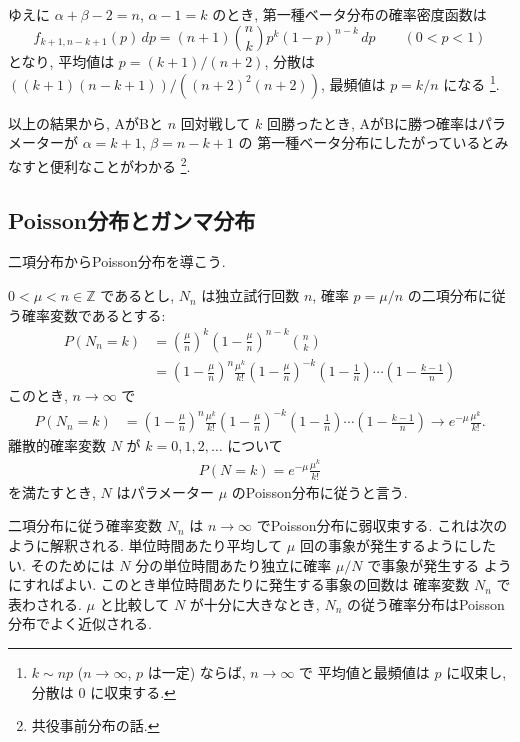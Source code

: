 \documentclass[12pt,twoside]{jarticle}
\newcommand\Z{{\mathbb Z}} %
\theoremstyle{jplain}
\theoremstyle{jplain}
\theoremstyle{jplain}
\numberwithin{theorem}{section}
\numberwithin{equation}{section}
\numberwithin{figure}{section}
\numberwithin{table}{section}
\begin{document}
ゆえに $\alpha+\beta-2=n$, $\alpha-1=k$ のとき,
第一種ベータ分布の確率密度函数は
\[
f_{k+1,n-k+1}(p)\,dp
=(n+1)\binom{n}{k} p^k(1-p)^{n-k}\,dp
\qquad (0<p<1)
\]
となり, 平均値は $p=(k+1)/(n+2)$, 分散は $((k+1)(n-k+1))/((n+2)^2(n+2))$,
最頻値は $p=k/n$ になる%
\footnote{$k\sim np$ ($n\to\infty$, $p$ は一定) ならば, $n\to\infty$ で
平均値と最頻値は $p$ に収束し, 分散は $0$ に収束する.}.

以上の結果から, AがBと $n$ 回対戦して $k$ 回勝ったとき,
AがBに勝つ確率はパラメーターが $\alpha=k+1$, $\beta=n-k+1$ の
第一種ベータ分布にしたがっているとみなすと便利なことがわかる%
\footnote{共役事前分布の話.}.


\subsection{Poisson分布とガンマ分布}
\label{sec:Poisson-Gamma}

二項分布からPoisson分布を導こう.

$0<\mu<n\in\Z$ であるとし,
$N_n$ は独立試行回数 $n$, 確率 $p=\mu/n$ の二項分布に従う確率変数であるとする:
\begin{align*}
P(N_n=k)
&= \left(\frac{\mu}{n}\right)^k \left(1-\frac{\mu}{n}\right)^{n-k} \binom{n}{k}
\\ &
= \left(1-\frac{\mu}{n}\right)^n \frac{\mu^k}{k!}
\left(1-\frac{\mu}{n}\right)^{-k} \left(1-\frac{1}{n}\right)\cdots\left(1-\frac{k-1}{n}\right)
\end{align*}
このとき, $n\to\infty$ で
\begin{align*}
P(N_n=k)
&
= \left(1-\frac{\mu}{n}\right)^n \frac{\mu^k}{k!}
\left(1-\frac{\mu}{n}\right)^{-k} \left(1-\frac{1}{n}\right)\cdots\left(1-\frac{k-1}{n}\right)
\longrightarrow
e^{-\mu}\frac{\mu^k}{k!}.
\end{align*}
離散的確率変数 $N$ が $k=0,1,2,\ldots$ について
\begin{align*}
P(N=k) = e^{-\mu}\frac{\mu^k}{k!}
\end{align*}
を満たすとき, $N$ はパラメーター $\mu$ のPoisson分布に従うと言う.

二項分布に従う確率変数 $N_n$ は $n\to\infty$ でPoisson分布に弱収束する.
これは次のように解釈される.
単位時間あたり平均して $\mu$ 回の事象が発生するようにしたい.
そのためには $N$ 分の単位時間あたり独立に確率 $\mu/N$ で事象が発生する
ようにすればよい. このとき単位時間あたりに発生する事象の回数は
確率変数 $N_n$ で表わされる.
$\mu$ と比較して $N$ が十分に大きなとき,
$N_n$ の従う確率分布はPoisson分布でよく近似される.
\end{document}
